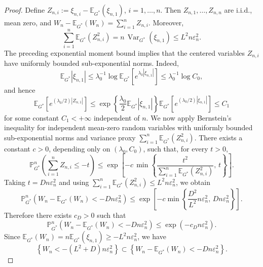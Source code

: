 \documentclass[twoside,12pt]{article}
\newcommand{\E}{\mathds{E}}
\renewcommand{\P}{\mathds{P}}
\begin{document}
\begin{proof}
Define $Z_{n,i}:=\xi_{n,i}-\E_{G^\ast}(\xi_{n,1})$, $i=1,\dots,n$. Then $Z_{n,1},\dots,Z_{n,n}$ are i.i.d., mean zero, and $W_n-\E_{G^\ast}(W_n)=
\sum_{i=1}^n Z_{n,i}$. Moreover,
\begin{displaymath}
\sum_{i=1}^n \E_{G^\ast}(Z_{n,i}^2)=n\,\operatorname{Var}_{G^\ast}(\xi_{n,1})\le L^2n\varepsilon_n^2.
\end{displaymath}
The preceding exponential moment bound implies that the centered variables $Z_{n,i}$ have uniformly bounded sub-exponential norms. Indeed,
\begin{displaymath}
\E_{G^\ast}|\xi_{n,1}|\le\lambda_0^{-1}\log \E_{G^\ast}\!\left[e^{\lambda_0|\xi_{n,1}|}\right]\le\lambda_0^{-1}\log C_0,
\end{displaymath}
and hence
\begin{displaymath}
\E_{G^\ast}\!\left[e^{(\lambda_0/2)|Z_{n,1}|}\right]\le\exp\!\left\{\frac{\lambda_0}{2}\E_{G^\ast}|\xi_{n,1}|\right\}\E_{G^\ast}\!\left[e^{(\lambda_0/2)|\xi_{n,1}|}\right]\le C_1
\end{displaymath}
for some constant $C_1<+\infty$ independent of $n$. We now apply Bernstein's inequality for independent mean-zero random variables with uniformly bounded sub-exponential norms and variance proxy $\sum_{i=1}^n\E_{G^\ast}(Z_{n,i}^2)$. There exists a constant $c>0$, depending only on
$(\lambda_0,C_0)$, such that, for every $t>0$,
\begin{displaymath}
\P_{G^\ast}^n\!\left(\sum_{i=1}^nZ_{n,i}\le -t\right)\le\exp\!\left[-c\,\min\!\left\{\frac{t^2}{\sum_{i=1}^n\E_{G^\ast}(Z_{n,i}^2)},\, t\right\}\right].
\end{displaymath}
Taking $t=Dn\varepsilon_n^2$ and using $\sum_{i=1}^n\E_{G^\ast}(Z_{n,i}^2)\le L^2n\varepsilon_n^2$, we obtain
\begin{displaymath}
\P_{G^\ast}^n\!\left(W_n-\E_{G^\ast}(W_n)<-Dn\varepsilon_n^2\right)\le\exp\!\left[-c\min\!\left\{\frac{D^2}{L^2}n\varepsilon_n^2,\,Dn\varepsilon_n^2\right\}\right].
\end{displaymath}
Therefore there exists $c_D>0$ such that
\begin{displaymath}
\P_{G^\ast}^n\!\left(W_n-\E_{G^\ast}(W_n)<-Dn\varepsilon_n^2\right)\le\exp(-c_Dn\varepsilon_n^2).
\end{displaymath}
Since $\E_{G^\ast}(W_n)=n\E_{G^\ast}(\xi_{n,1})\ge -L^2n\varepsilon_n^2$, we have
\begin{displaymath}
\left\{W_n<-(L^2+D)n\varepsilon_n^2\right\}\subset\left\{W_n-\E_{G^\ast}(W_n)<-Dn\varepsilon_n^2\right\}.
\end{displaymath}

\end{proof}
\end{document}

